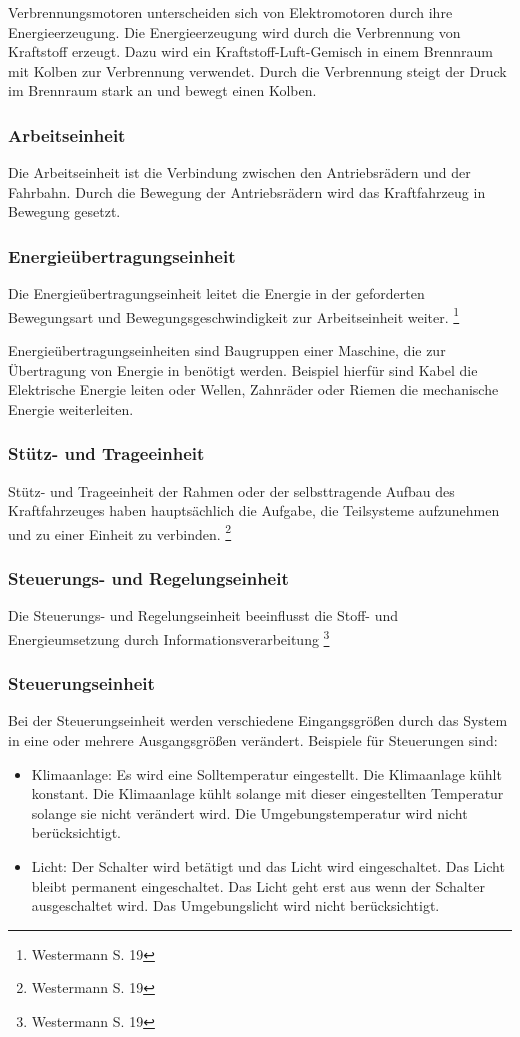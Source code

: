 Verbrennungsmotoren unterscheiden sich von Elektromotoren durch ihre Energieerzeugung.
Die Energieerzeugung wird durch die Verbrennung von Kraftstoff erzeugt.
Dazu wird ein Kraftstoff-Luft-Gemisch in einem Brennraum mit Kolben zur Verbrennung verwendet.
Durch die Verbrennung steigt der Druck im Brennraum stark an und bewegt einen Kolben.

\subsubsection{Arbeitseinheit}
Die Arbeitseinheit ist die Verbindung zwischen den Antriebsrädern und der Fahrbahn.
Durch die Bewegung der Antriebsrädern wird das Kraftfahrzeug in Bewegung gesetzt.

\subsubsection{Energieübertragungseinheit}
Die Energieübertragungseinheit leitet die Energie in der geforderten Bewegungsart und Bewegungsgeschwindigkeit zur Arbeitseinheit weiter.
\footnote{Westermann S. 19}

Energieübertragungseinheiten sind Baugruppen einer Maschine, die zur Übertragung von Energie in benötigt werden.
Beispiel hierfür sind Kabel die Elektrische Energie leiten oder Wellen, Zahnräder oder Riemen die mechanische Energie weiterleiten.

\subsubsection{Stütz- und Trageeinheit}
Stütz- und Trageeinheit der Rahmen oder der selbsttragende Aufbau des Kraftfahrzeuges haben hauptsächlich die Aufgabe, die Teilsysteme aufzunehmen und zu einer Einheit zu verbinden.
\footnote{Westermann S. 19}


\subsubsection{Steuerungs- und Regelungseinheit}
Die Steuerungs- und Regelungseinheit beeinflusst die Stoff- und Energieumsetzung durch Informationsverarbeitung
\footnote{Westermann S. 19}

\subsubsection{Steuerungseinheit}
Bei der Steuerungseinheit werden verschiedene Eingangsgrößen durch das System in eine oder mehrere Ausgangsgrößen verändert.
Beispiele für Steuerungen sind:
\begin{itemize}
	\item Klimaanlage: Es wird eine Solltemperatur eingestellt.
	      Die Klimaanlage kühlt konstant.
	      Die Klimaanlage kühlt solange mit dieser eingestellten Temperatur solange sie nicht verändert wird.
	      Die Umgebungstemperatur wird nicht berücksichtigt.
	\item Licht: Der Schalter wird betätigt und das Licht wird eingeschaltet.
	      Das Licht bleibt permanent eingeschaltet.
	      Das Licht geht erst aus wenn der Schalter ausgeschaltet wird.
	      Das Umgebungslicht wird nicht berücksichtigt.
\end{itemize}
